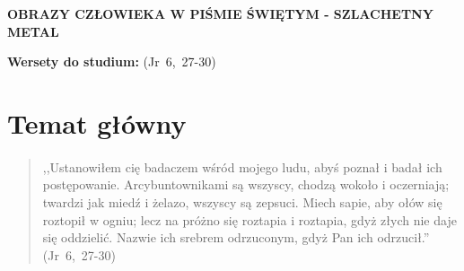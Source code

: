\documentclass[10pt,a4paper,oneside]{article}
\begin{document}
\centerline{\textbf{\MakeUppercase{Obrazy człowieka w Piśmie Świętym - szlachetny metal}}}
\begin{center}
\textbf{Wersety do studium:} 
\mbox{(Jr 6, 27-30)}
\end{center}
\section{Temat główny}
\paragraph{}
\begin{quote}
,,Ustanowiłem cię badaczem wśród mojego ludu, abyś poznał i badał ich postępowanie. Arcybuntownikami są wszyscy, chodzą wokoło i oczerniają; twardzi jak miedź i żelazo, wszyscy są zepsuci. Miech sapie, aby ołów się roztopił w ogniu; lecz na próżno się roztapia i roztapia, gdyż złych nie daje się oddzielić. Nazwie ich srebrem odrzuconym, gdyż Pan ich odrzucił.'' \mbox{(Jr 6, 27-30)}
\end{quote}
\end{document}
